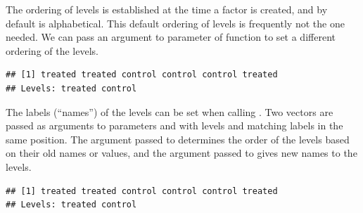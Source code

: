 \documentclass[krantz2]{krantz}\usepackage{knitr}
\begin{document}
The ordering of levels is established at the time a factor is created, and by default is alphabetical. This default ordering of levels is frequently not the one needed. We can pass an argument to parameter  of function  to set a different ordering of the levels.

\begin{knitrout}\footnotesize
{}\color{fgcolor}\begin{kframe}
\begin{alltt}
\hlstd{(}   \hlstd{=} \hlstd{(}\hlstd{,} \hlstd{))}
\end{alltt}
\begin{verbatim}
## [1] treated treated control control control treated
## Levels: treated control
\end{verbatim}
\end{kframe}
\end{knitrout}

The labels (``names'') of the levels can be set when calling . Two vectors are passed as arguments to parameters  and  with levels and matching labels in the same position. The argument passed to  determines the order of the levels based on their old names or values, and the argument passed to  gives new names to the levels.

\begin{knitrout}\footnotesize
{}\color{fgcolor}\begin{kframe}
\begin{alltt}
\hlstd{(} \hlstd{=} \hlstd{(}\hlstd{,} \hlstd{,} \hlstd{,} \hlstd{,} \hlstd{,} \hlstd{),}  \hlstd{=} \hlstd{(}\hlstd{,} \hlstd{),}  \hlstd{=} \hlstd{(}\hlstd{,} \hlstd{))}
\end{alltt}
\begin{verbatim}
## [1] treated treated control control control treated
## Levels: treated control
\end{verbatim}
\end{kframe}
\end{knitrout}
\end{document}
